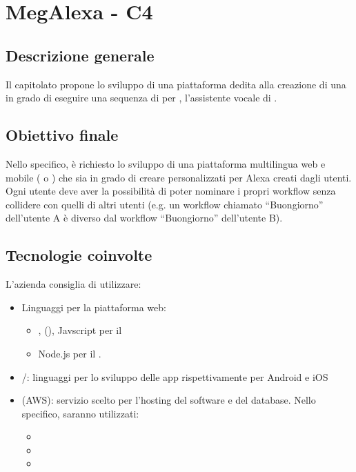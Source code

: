\section{MegAlexa - C4} \label{c4}

    \subsection{Descrizione generale}
    Il capitolato propone lo sviluppo di una piattaforma
    dedita alla creazione di una  in grado di eseguire una sequenza
    di  per , l'assistente vocale di .

    \subsection{Obiettivo finale}
    Nello specifico, \`e richiesto lo sviluppo di una piattaforma multilingua web e
    mobile ( o ) che sia in grado di
    creare  personalizzati per Alexa creati dagli utenti. Ogni utente
    deve aver la possibilit\`a di poter nominare i propri workflow senza collidere con
    quelli di altri utenti (e.g. un workflow chiamato ``Buongiorno'' dell'utente A \`e
    diverso dal workflow ``Buongiorno'' dell'utente B).

    \subsection{Tecnologie coinvolte}
    L'azienda consiglia di utilizzare:
    \begin{itemize}
    	\item Linguaggi per la piattaforma web:
    	\begin{itemize}
            \item {},  (), Javscript
                per il 
            \item Node.js per il .
    	\end{itemize}
        \item {}/: linguaggi per lo sviluppo delle app
            rispettivamente per Android e iOS
        \item {} (AWS): servizio scelto per l'hosting del software e del database.
            Nello specifico, saranno utilizzati:
            \begin{itemize}
                \item {}
                \item {}
                \item {}
            \end{itemize}
    \end{itemize}


